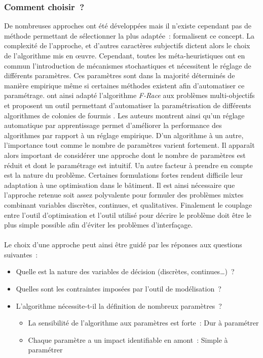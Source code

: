 \subsubsection{Comment choisir~?} %
\label{ssub:comment_choisir}
De nombreuses approches ont été développées mais il n’existe cependant pas de
méthode permettant de sélectionner la plus adaptée~: \textcite{Wolpert199767}
formalisent ce concept. La complexité de l’approche, et d’autres caractères
subjectifs dictent alors le choix de l’algorithme mis en œuvre. Cependant, toutes
les méta-heuristiques ont en commun l’introduction de mécanismes stochastiques
et nécessitent le réglage de différents paramètres. Ces paramètres sont dans la
majorité déterminés de manière empirique même si certaines méthodes
existent afin d’automatiser ce paramétrage. \textcite{Lopez-Ibanez2012861} ont ainsi
adapté l’algorithme \textit{F-Race} \parencite{Birattari2010311} aux problèmes
multi-objectifs et proposent un outil permettant d’automatiser la paramétrisation de
différents algorithmes de colonies de fourmis \parencite{Lopez-Ibanez2012861}.
Les auteurs montrent ainsi qu’un réglage automatique par apprentissage permet
d’améliorer la performance des algorithmes par rapport à un réglage empirique.
D’un algorithme à un autre, l’importance tout comme le nombre de paramètres
varient fortement. Il apparaît alors important de considérer une approche dont le
nombre de paramètres est réduit et dont le paramétrage est intuitif. Un autre
facteur à prendre en compte est la nature du problème. Certaines formulations
fortes rendent difficile leur adaptation à une optimisation dans le bâtiment. Il
est ainsi nécessaire que l’approche retenue soit assez polyvalente pour formuler des
problèmes mixtes combinant variables discrètes, continues, et qualitatives.
Finalement le couplage entre l’outil d’optimisation et l’outil utilisé pour
décrire le problème doit être le plus simple possible afin d’éviter les
problèmes d’interfaçage.

\paragraph{} %
\noindent
Le choix d’une approche peut ainsi être guidé par les réponses aux questions
suivantes~:
\begin{itemize}
  \item Quelle est la nature des variables de décision (discrètes, continues\dots)~?
  \item Quelles sont les contraintes imposées par l’outil de modélisation~?
  \item L’algorithme nécessite-t-il la définition de nombreux paramètres~?
    \begin{itemize}
      \item La sensibilité de l’algorithme aux paramètres est forte~: Dur à paramétrer
      \item Chaque paramètre a un impact identifiable en amont~: Simple à paramétrer
    \end{itemize}
\end{itemize}

